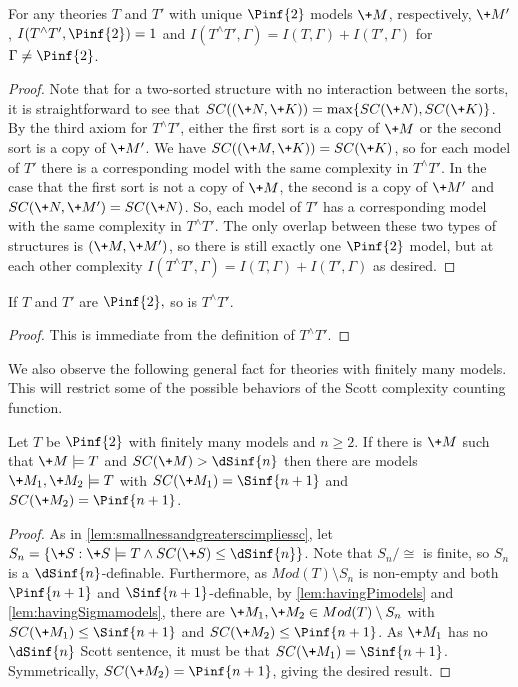 \documentclass[10pt,a4paper]{amsart}
\renewcommand{\-}{\text{-}}
\begin{document}
\begin{lemma}
For any theories $T$ and $T'$ with unique $\Pinf{2}$ models $\+M$, respectively, $\+M'$, $I(T^\wedge T',\Pinf{2})=1$ and $I(T^\wedge T',\Gamma)=I(T,\Gamma)+I(T',\Gamma)$ for $\Gamma\neq \Pinf{2}$.
\end{lemma}

\begin{proof}
  Note that for a two-sorted structure with no interaction between the sorts, it is straightforward to see that $SC((\+N,\+K))=\max\{SC(\+N),SC(\+K)\}$.
By the third axiom for $T^\wedge T'$, either the first sort is a copy of $\+M$ or the second sort is a copy of $\+M'$.
We have $SC((\+M,\+K))=SC(\+K)$, so for each model of $T'$ there is a corresponding model with the same complexity in $T^\wedge T'$.
In the case that the first sort is not a copy of $\+M$, the second is a copy of $\+M'$ and $SC(\+N,\+M')=SC(\+N)$.
So, each model of $T'$ has a corresponding model with the same complexity in $T^\wedge T'$.
The only overlap between these two types of structures is $(\+M,\+M')$, so there is still exactly one $\Pinf{2}$ model, but at each other complexity $I(T^\wedge T',\Gamma)=I(T,\Gamma)+I(T',\Gamma)$ as desired.
\end{proof}

\begin{lemma}
If $T$ and $T'$ are $\Pinf{2},$ so is $T^\wedge T'$.
\end{lemma}

\begin{proof}
This is immediate from the definition of $T^\wedge T'$.
\end{proof}

We also observe the following general fact for theories with finitely many models.
This will restrict some of the possible behaviors of the Scott complexity counting function.

\begin{proposition}\label{prop:aboveDSinfGivesSinfPinf}
Let $T$ be $\Pinf{2}$ with finitely many models and $n\geq2$.
If there is $\+M$ such that $\+M\models T$ and $SC(\+M)>\dSinf{n}$ then there are models $\+M_1,\+M_2\models T$ with $SC(\+M_1)=\Sinf{n+1}$ and $SC(\+M_2)=\Pinf{n+1}$.
\end{proposition}

\begin{proof}
As in \cref{lem:smallnessandgreaterscimpliessc}, let $S_n=\{ \+S: \+S\models T \land SC(\+S)\leq \dSinf{n}\}$.
Note that $S_n/{\cong}$ is finite, so $S_n$ is a $\dSinf{n}$-definable.
Furthermore, as $Mod(T)\setminus S_n$ is  non-empty and both $\Pinf{n+1}$ and $\Sinf{n+1}$-definable, 
by \cref{lem:havingPimodels} and \cref{lem:havingSigmamodels}, there are $\+M_1,\+M_2\in Mod(T)\setminus S_n$ with $SC(\+M_1)\leq\Sinf{n+1}$ and $SC(\+M_2)\leq\Pinf{n+1}$.
As $\+M_1$ has no $\dSinf{n}$ Scott sentence, it must be that $SC(\+M_1)=\Sinf{n+1}$.
Symmetrically, $SC(\+M_2)=\Pinf{n+1}$, giving the desired result.
\end{proof}
\end{document}

